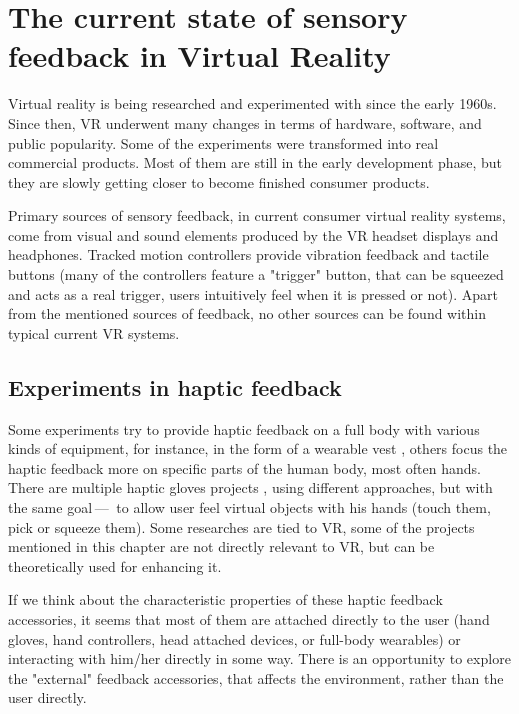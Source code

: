 \chapter{The current state of sensory feedback in Virtual Reality}

Virtual reality is being researched and experimented with since the early 1960s.
\cite{vrhistory} Since then, VR underwent many changes in terms of hardware,
software, and public popularity.
Some of the experiments were transformed into real commercial products.
Most of them are still in the early development phase, but they are slowly getting
closer to become finished consumer products.


Primary sources of sensory feedback, in current consumer virtual reality systems,
come from visual and sound elements produced by the VR headset displays and
headphones. Tracked
motion controllers provide vibration feedback and tactile buttons (many of
the controllers feature a "trigger" button, that can be squeezed and acts as
a real trigger, users intuitively feel when it is pressed or not).
Apart from the mentioned sources of feedback, no other sources can be found
within typical current VR systems.


\hypertarget{x-experiments-in-haptic-feedback}{\section{Experiments in haptic feedback}}
Some experiments try to provide haptic feedback on a full body with various
kinds of equipment, for instance, in the form of a wearable vest \cite{tfbhf},
others focus the haptic feedback more on specific parts of the
human body, most often hands. There are multiple haptic gloves projects
\cite{haptgloves}, using different approaches, but with the same goal — 
to allow user feel virtual objects with his hands
(touch them, pick or squeeze them). Some researches are tied to VR,
some of the projects mentioned in this chapter are not directly relevant
to VR, but can be theoretically used for enhancing it.

If we think about the characteristic properties of these haptic feedback
accessories, it seems that most of them are attached directly to the
user (hand gloves, hand controllers, head attached devices, or full-body wearables)
or interacting with him/her directly in some way. There is an opportunity to explore
the "external" feedback accessories, that affects the environment, rather than
the user directly.

